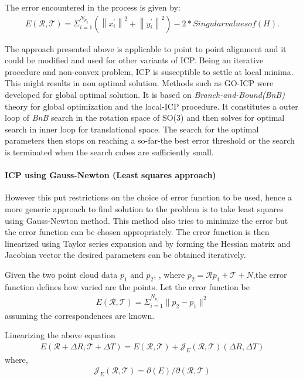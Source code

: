 The error encountered in the process is given by:
\begin{gather}  
E(\mathcal{R}, \mathcal{T}) = \Sigma_{i=1}^{N_{p_2}}(\left\lVert x_i^{'} \right\rVert^2 + \left\lVert y_i^{'} \right\rVert^2) - 2* Singular values of (H).
\end{gather}

The approach presented above is applicable to point to point alignment and it could be modified and used for other variants of ICP. Being an iterative procedure and non-convex problem, ICP is susceptible to settle at local minima. This might results in non optimal solution. Methods such as GO-ICP \cite{Yang_2016} were developed for global optimal solution. It is based on \textit{Branch-and-Bound(BnB)} theory for global optimization and the local-ICP procedure. It constitutes a outer loop of \textit{BnB} search in the rotation space of SO(3) and then solves for optimal search in inner loop for translational space. The search for the optimal parameters then stops on reaching a so-far-the best error threshold or the search is terminated when the search cubes are sufficiently small. 
\par
\paragraph{ICP using Gauss-Newton (Least squares approach)}
However this put restrictions on the choice of error function to be used, hence a more generic approach to find solution to the problem is to take least squares using Gauss-Newton method. This method also tries to minimize the error but the error function can be chosen appropriately. The error function is then linearized using Taylor series expansion and by forming the Hessian matrix and Jacobian vector the desired parameters can be obtained iteratively. 
\par
Given the two point cloud data $p_1$ and $p_2$, , where $p_2 = \mathcal{R}p_1 + \mathcal{T} + N$,the error function defines how varied are the points.
Let the error function be
\begin{gather} 
    E(\mathcal{R}, \mathcal{T}) = \Sigma_{i=1}^{N_{p_1}}\lVert p_2 -  p_1 \rVert^2
\end{gather}
assuming the correspondences are known.
\par
Linearizing the above equation
\begin{gather} 
    E(\mathcal{R}+\Delta{R} , \mathcal{T}+ \Delta{T}) = E(\mathcal{R}, \mathcal{T}) + \mathcal{J}_E(\mathcal{R}, \mathcal{T})(\Delta{R} ,\Delta{T})
\end{gather}
where,
\begin{gather} 
    \mathcal{J}_E(\mathcal{R}, \mathcal{T}) = \partial (E) / \partial (\mathcal{R}, \mathcal{T})
\end{gather}

